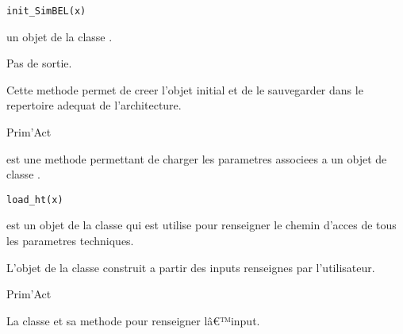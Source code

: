 \documentclass[a4paper]{book}
\begin{document}
%
\begin{Usage}
\begin{verbatim}
init_SimBEL(x)
\end{verbatim}
\end{Usage}
%
\begin{Arguments}
\begin{ldescription}
\item[\code{x}] un objet de la classe .
\end{ldescription}
\end{Arguments}
%
\begin{Value}
Pas de sortie.
\end{Value}
%
\begin{Note}\relax
Cette methode permet de creer l'objet  initial et de le sauvegarder dans le repertoire adequat de l'architecture.
\end{Note}
%
\begin{Author}\relax
Prim'Act
\end{Author}
%
\begin{Description}\relax
{} est une methode permettant de charger les parametres associees a un
objet de classe .
\end{Description}
%
\begin{Usage}
\begin{verbatim}
load_ht(x)
\end{verbatim}
\end{Usage}
%
\begin{Arguments}
\begin{ldescription}
\item[\code{x}] est un objet de la classe  qui est utilise pour renseigner le chemin
d'acces de tous les parametres techniques.
\end{ldescription}
\end{Arguments}
%
\begin{Value}
L'objet de la classe  construit a partir des inputs renseignes par l'utilisateur.
\end{Value}
%
\begin{Author}\relax
Prim'Act
\end{Author}
%
\begin{SeeAlso}\relax
La classe  et sa methode 
pour renseigner lâ€™input.
\end{SeeAlso}
\end{document}
